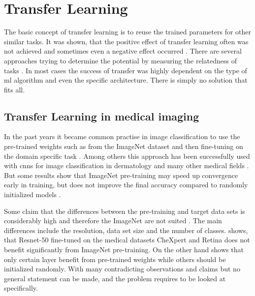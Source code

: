 \section{Transfer Learning}
The basic concept of transfer learning is to reuse the trained parameters for other similar tasks. It was shown, that the positive effect of transfer learning often was not achieved and sometimes even a negative effect occurred \autocite{perkins1999}. There are several approaches trying to determine the potential by measuring the relatedness of tasks \autocite{torrey2009}. In most cases the success of transfer was highly dependent on the type of \gls{ml} algorithm and even the specific architecture. There is simply no solution that fits all.

\subsection{Transfer Learning in medical imaging}
In the past years it became common practise in image classification to use the pre-trained weights such as from the ImageNet dataset and then fine-tuning on the domain specific task \autocite{russakovsky2014}. 
Among others this approach has been successfully used with \glspl{cnn} for image classification in dermatology and many other medical fields \autocite{esteva2017,lam2018,bayramoglu2016,pardamean2018,yang2018}. But some results show that ImageNet pre-training may speed up convergence early in training, but does not improve the final accuracy compared to randomly initialized models \autocite{he2018}.

Some claim that the differences between the pre-training and target data sets is considerably high and therefore the ImageNet are not suited \autocite{raghu2019}.
The main differences include the resolution, data set size and the number of classes.
\autocite{raghu2019} shows, that Resnet-50 fine-tuned on the medical datasets CheXpert and Retina does not benefit significantly from ImageNet pre-training. On the other hand \autocite{raghu2019} shows that only certain layer benefit from pre-trained weights while others should be initialized randomly. With many contradicting observations and claims but no general statement can be made, and the problem requires to be looked at specifically.




